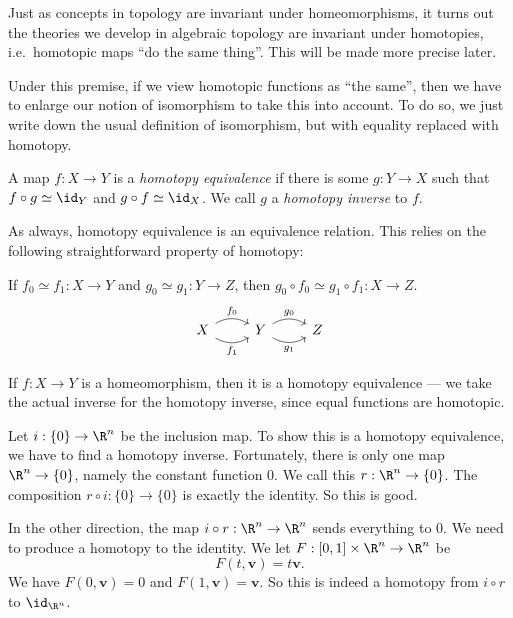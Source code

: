 \documentclass[a4paper]{article}
\theoremstyle{definition}
\begin{document}
Just as concepts in topology are invariant under homeomorphisms, it turns out the theories we develop in algebraic topology are invariant under homotopies, i.e.\ homotopic maps ``do the same thing''. This will be made more precise later.

Under this premise, if we view homotopic functions as ``the same'', then we have to enlarge our notion of isomorphism to take this into account. To do so, we just write down the usual definition of isomorphism, but with equality replaced with homotopy.

\begin{defi}
  A map $f: X \to Y$ is a \emph{homotopy equivalence} if there is some $g: Y \to X$ such that $f \circ g \simeq \id_Y$ and $g \circ f \simeq \id_X$. We call $g$ a \emph{homotopy inverse} to $f$.
\end{defi}
As always, homotopy equivalence is an equivalence relation. This relies on the following straightforward property of homotopy:

\begin{prop}
  If $f_0 \simeq f_1: X \to Y$ and $g_0 \simeq g_1: Y \to Z$, then $g_0 \circ f_0 \simeq g_1 \circ f_1: X \to Z$.
  \[
    \begin{tikzcd}
      X \ar[r, bend left, "f_0"] \ar[r, bend right, "f_1"'] & Y \ar[r, bend left, "g_0"] \ar[r, bend right, "g_1"'] & Z
    \end{tikzcd}
  \]
\end{prop}

\begin{eg}
  If $f: X \to Y$ is a homeomorphism, then it is a homotopy equivalence --- we take the actual inverse for the homotopy inverse, since equal functions are homotopic.
\end{eg}

\begin{eg}
  Let $i: \{0\} \to \R^n$ be the inclusion map. To show this is a homotopy equivalence, we have to find a homotopy inverse. Fortunately, there is only one map $\R^n \to \{0\}$, namely the constant function $0$. We call this $r: \R^n \to \{0\}$. The composition $r \circ i: \{0\} \to \{0\}$ is exactly the identity. So this is good.

  In the other direction, the map $i \circ r: \R^n \to \R^n$ sends everything to $0$. We need to produce a homotopy to the identity. We let $F: [0, 1] \times \R^n \to \R^n$ be
  \[
    F(t, \mathbf{v}) = t\mathbf{v}.
  \]
  We have $F(0, \mathbf{v}) = 0$ and $F(1, \mathbf{v}) = \mathbf{v}$. So this is indeed a homotopy from $i \circ r$ to $\id_{\R^n}$.
\end{eg}
\end{document}
